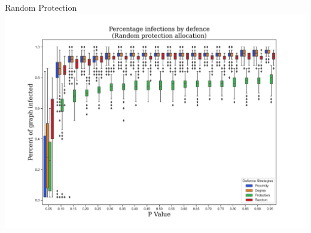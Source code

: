\documentclass[unknownkeysallowed]{beamer}
\begin{document}



\begin{frame}{Random Protection}
\centering\includegraphics[height=0.8\textheight]{assets/charts/percent_infected/Random.jpg}
\end{frame}

%
\end{document}
